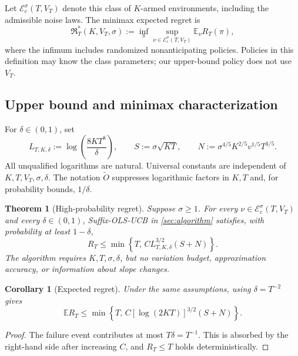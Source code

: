\documentclass[11pt]{article}
\newtheorem{theorem}{Theorem}[section]
\newtheorem{corollary}[corollary]{Corollary}
\theoremstyle{remark}
\newcommand{\E}{\mathbb E}
\newcommand{\cE}{\mathcal E}
\newcommand{\calR}{\mathfrak R}
\begin{document}
Let $\cE_c^\sigma(T,V_T)$ denote this class of $K$-armed environments, including the admissible noise laws. The minimax expected regret is
\begin{equation}\label{eq:minimax-def}
\calR_T^*(K,V_T,\sigma)
:=\inf_{\pi}\sup_{\nu\in\cE_c^\sigma(T,V_T)}\E_\nu R_T(\pi),
\end{equation}
where the infimum includes randomized nonanticipating policies. Policies in this definition may know the class parameters; our upper-bound policy does not use $V_T$.

\subsection{Upper bound and minimax characterization}

For $\delta\in(0,1)$, set
\begin{equation}\label{eq:L-def}
L_{T,K,\delta}:=\log\!\left(\frac{8KT^8}{\delta}\right),
\qquad
S:=\sigma\sqrt{KT},
\qquad
N:=\sigma^{4/5}K^{2/5}v^{1/5}T^{3/5}.
\end{equation}
All unqualified logarithms are natural. Universal constants are independent of $K,T,V_T,\sigma,\delta$. The notation $\widetilde O$ suppresses logarithmic factors in $K,T$ and, for probability bounds, $1/\delta$.

\begin{samepage}
\begin{theorem}[High-probability regret]\label{thm:high-prob-main}
Suppose $\sigma\ge1$. For every $\nu\in\cE_c^\sigma(T,V_T)$ and every $\delta\in(0,1)$, Suffix-OLS-UCB in \cref{sec:algorithm} satisfies, with probability at least $1-\delta$,
\begin{equation}\label{eq:high-prob-rate}
R_T\le\min\left\{T,\,C L_{T,K,\delta}^{3/2}(S+N)\right\}.
\end{equation}
The algorithm requires $K,T,\sigma,\delta$, but no variation budget, approximation accuracy, or information about slope changes.
\end{theorem}
\end{samepage}

\begin{samepage}
\begin{corollary}[Expected regret]\label{cor:expected-main}
Under the same assumptions, using $\delta=T^{-2}$ gives
\begin{equation}\label{eq:expected-rate}
\E R_T\le\min\left\{T,\,C[\log(2KT)]^{3/2}(S+N)\right\}.
\end{equation}
\end{corollary}
\end{samepage}
\begin{proof}
The failure event contributes at most $T\delta=T^{-1}$. This is absorbed by the right-hand side after increasing $C$, and $R_T\le T$ holds deterministically.
\end{proof}
\end{document}
